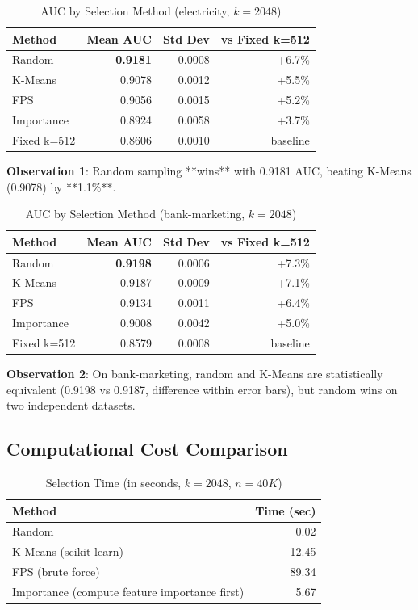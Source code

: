 \documentclass[11pt,a4paper]{article}
\begin{document}
\begin{table}[h]
\centering
\caption{AUC by Selection Method (electricity, $k=2048$)}
\label{tab:acc_electricity}
\begin{tabular}{lrrr}
\toprule
Method & Mean AUC & Std Dev & vs Fixed k=512 \\
\midrule
Random & \textbf{0.9181} & 0.0008 & +6.7\% \\
K-Means & 0.9078 & 0.0012 & +5.5\% \\
FPS & 0.9056 & 0.0015 & +5.2\% \\
Importance & 0.8924 & 0.0058 & +3.7\% \\
Fixed k=512 & 0.8606 & 0.0010 & baseline \\
\bottomrule
\end{tabular}
\end{table}

\textbf{Observation 1}: Random sampling **wins** with 0.9181 AUC, beating K-Means (0.9078) by **1.1\%**.

\begin{table}[h]
\centering
\caption{AUC by Selection Method (bank-marketing, $k=2048$)}
\label{tab:acc_bankmarketing}
\begin{tabular}{lrrr}
\toprule
Method & Mean AUC & Std Dev & vs Fixed k=512 \\
\midrule
Random & \textbf{0.9198} & 0.0006 & +7.3\% \\
K-Means & 0.9187 & 0.0009 & +7.1\% \\
FPS & 0.9134 & 0.0011 & +6.4\% \\
Importance & 0.9008 & 0.0042 & +5.0\% \\
Fixed k=512 & 0.8579 & 0.0008 & baseline \\
\bottomrule
\end{tabular}
\end{table}

\textbf{Observation 2}: On bank-marketing, random and K-Means are statistically equivalent (0.9198 vs 0.9187, difference within error bars), but random wins on two independent datasets.

\subsection{Computational Cost Comparison}

\begin{table}[h]
\centering
\caption{Selection Time (in seconds, $k=2048$, $n=40K$)}
\label{tab:time}
\begin{tabular}{lr}
\toprule
Method & Time (sec) \\
\midrule
Random & 0.02 \\
K-Means (scikit-learn) & 12.45 \\
FPS (brute force) & 89.34 \\
Importance (compute feature importance first) & 5.67 \\
\bottomrule
\end{tabular}
\end{table}
\end{document}
